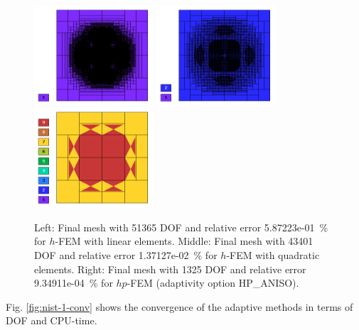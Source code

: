\documentclass[12pt]{elsarticle}
\begin{document}
\begin{figure}[!ht]
\centering
\includegraphics[height=3.7cm]{nist/nist-1/mesh_h1_aniso.png}
\includegraphics[height=3.7cm]{nist/nist-1/mesh_h2_aniso.png}
\includegraphics[height=3.7cm]{nist/nist-1/mesh_hp_aniso.png}
\vspace{-3mm}
\caption{
Left: Final mesh with 51365 DOF and relative error 5.87223e-01~\% for $h$-FEM with linear elements.
Middle: Final mesh with 43401 DOF and relative error 1.37127e-02~\% for $h$-FEM with quadratic elements.
Right: Final mesh with 1325 DOF and relative error 9.34911e-04~\% for $hp$-FEM (adaptivity option HP\_ANISO).}
\label{fig:nist-1-hp-aniso}
\vspace{-3mm}
\end{figure}

Fig. \ref{fig:nist-1-conv} shows the convergence of the adaptive methods in terms of DOF and CPU-time.
\end{document}
